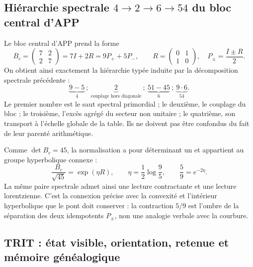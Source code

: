 \subsection{Hiérarchie spectrale \(4\to2\to6\to54\) du bloc central d'APP}

Le bloc central d'APP prend la forme
\[
 B_c=\begin{pmatrix}7&2\\2&7\end{pmatrix}
     =7I+2R
     =9P_++5P_-,
 \qquad
 R=\begin{pmatrix}0&1\\1&0\end{pmatrix},
 \quad P_\pm=\frac{I\pm R}{2}.
 \tag{GMC-2.4}
\]
On obtient ainsi exactement la hiérarchie typée induite par la
décomposition spectrale précédente :
\[
 \underbrace{9-5}_{4}
 \ ;\ 
 \underbrace{2}_{\text{couplage hors diagonale}}
 \ ;\ 
 \underbrace{51-45}_{6}
 \ ;\ 
 \underbrace{9\cdot6}_{54}.
 \tag{GMC-2.5}
\]
Le premier nombre est le saut spectral primordial ; le deuxième, le couplage
du bloc ; le troisième, l'excès agrégé du secteur non unitaire ; le quatrième,
son transport à l'échelle globale de la table. Ils ne doivent pas être confondus du fait de leur
parenté arithmétique.

Comme $\det B_c=45$, la normalisation a pour déterminant un et appartient au
groupe hyperbolique connexe :
\[
 \frac{B_c}{\sqrt{45}}
 =\exp(\eta R),
 \qquad
 \eta=\frac12\log\frac95,
 \qquad
 \frac59=e^{-2\eta}.
 \tag{GMC-2.6}
\]
La même paire spectrale admet ainsi une lecture contractante et une lecture
lorentzienne. C'est la connexion précise avec la convexité et l'intérieur
hyperbolique que le pont doit conserver : la contraction $5/9$ est l'ombre
de la séparation des deux idempotents $P_\pm$, non une analogie verbale avec
la courbure.

\subsection{TRIT : état visible, orientation, retenue et mémoire généalogique}

